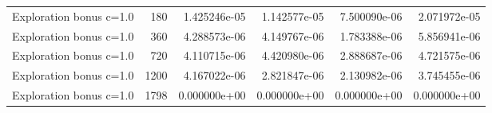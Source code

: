 \begin{scriptsize}
\begin{longtable}{lrrrrr}
Exploration bonus c=1.0 & 180 & 1.425246e-05 & 1.142577e-05 & 7.500090e-06 & 2.071972e-05 \\
Exploration bonus c=1.0 & 360 & 4.288573e-06 & 4.149767e-06 & 1.783388e-06 & 5.856941e-06 \\
Exploration bonus c=1.0 & 720 & 4.110715e-06 & 4.420980e-06 & 2.888687e-06 & 4.721575e-06 \\
Exploration bonus c=1.0 & 1200 & 4.167022e-06 & 2.821847e-06 & 2.130982e-06 & 3.745455e-06 \\
Exploration bonus c=1.0 & 1798 & 0.000000e+00 & 0.000000e+00 & 0.000000e+00 & 0.000000e+00 \\
\bottomrule
\end{longtable}
\end{scriptsize}